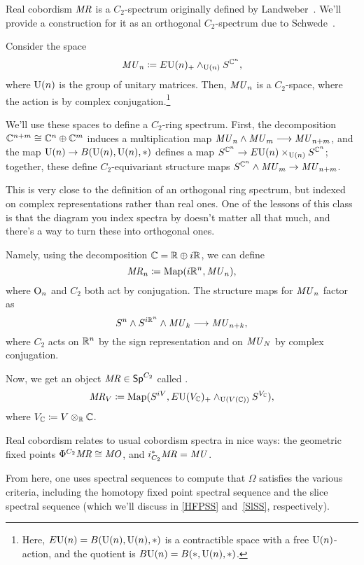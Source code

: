 \begin{defn}
\label{MRdefn}
Real cobordism $\mathit{MR}$ is a $C_2$-spectrum originally defined by Landweber~\cite{LandweberMR}. We'll provide a
construction for it as an orthogonal $C_2$-spectrum due to Schwede~\cite{SchwedeEquivariant}.

Consider the space
\[\mathit{MU}_n\coloneqq E\mathrm U(n)_+\wedge_{\mathrm U(n)} S^{\mathbb C^n},\]
where $\mathrm U(n)$ is the group of unitary matrices. Then, $\mathit{MU}_n$ is a $C_2$-space, where the action is by complex
conjugation.\footnote{Here, $E\mathrm U(n) = B(\mathrm U(n), \mathrm U(n), *)$ is a contractible space with a free $\mathrm U(n)$-action, and
the quotient is $B\mathrm U(n) = B(*, \mathrm U(n), *)$.}

We'll use these spaces to define a $C_2$-ring spectrum. First, the decomposition $\mathbb C^{n+m}\cong\mathbb C^n\oplus\mathbb C^m$
induces a multiplication map $\mathit{MU}_n\wedge\mathit{MU}_m\longrightarrow \mathit{MU}_{n+m}$, and the map $\mathrm U(n)\to B(\mathrm U(n), \mathrm U(n), *)$
defines a map $S^{\mathbb C^n}\to E\mathrm U(n)\times_{\mathrm U(n)} S^{\mathbb C^n}$; together, these define $C_2$-equivariant structure maps
$S^{\mathbb C^n}\wedge\mathit{MU}_m\to \mathit{MU}_{n+m}$.

This is very close to the definition of an orthogonal ring spectrum, but indexed on complex representations rather
than real ones. One of the lessons of this class is that the diagram you index spectra by doesn't matter all that
much, and there's a way to turn these  into orthogonal ones.

Namely, using the decomposition $\mathbb C = \mathbb R\oplus i\mathbb R$, we can define
\[\mathit{MR}_n\coloneqq \operatorname{Map}(i\mathbb R^n, \mathit{MU}_n),\]
where $\mathrm O_n$ and $C_2$ both act by conjugation. The structure maps for $\mathit{MU}_n$ factor as
\[S^n\wedge S^{i\mathbb R^n}\wedge\mathit{MU}_k\longrightarrow \mathit{MU}_{n+k},\]
where $C_2$ acts on $\mathbb R^n$ by the sign representation and on $\mathit{MU}_N$ by complex conjugation.

Now, we get an object $\mathit{MR}\in\mathsf{Sp}^{C_2}$ called .
\[\mathit{MR}_V \coloneqq \operatorname{Map}(S^{iV}, E\mathrm U(V_\mathbb C)_+\wedge_{\mathrm U(V(\mathbb C))}S^{V_\mathbb C}),\]
where $V_\mathbb C\coloneqq V\otimes_\mathbb R\mathbb C$.
\end{defn}
Real cobordism relates to usual cobordism spectra in nice ways: the geometric fixed points
$\Phi^{C_2}\mathit{MR}\cong\mathit{MO}$, and $i_{C_2}^*\mathit{MR} = \mathit{MU}$.

From here, one uses spectral sequences to compute that $\Omega$ satisfies the various criteria, including the
homotopy fixed point spectral sequence and the slice spectral sequence (which we'll discuss in \cref{HFPSS}
and~\eqref{SlSS}, respectively).
